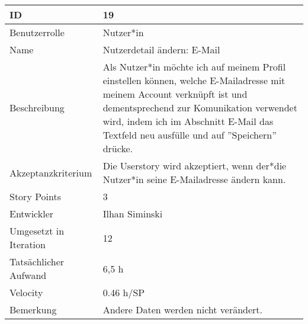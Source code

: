 \begin{tabularx}{\textwidth}{|p{}|X|}
	\hline
	ID & 19\\
	\hline
	Benutzerrolle & Nutzer*in\\
	\hline
	Name & Nutzerdetail ändern: E-Mail\\
	\hline
	Beschreibung & Als Nutzer*in möchte ich auf meinem Profil einstellen können, welche E-Mailadresse mit meinem Account verknüpft ist und dementsprechend zur Komunikation verwendet wird, indem ich im Abschnitt E-Mail das Textfeld neu ausfülle und auf ''Speichern'' drücke.\\
	\hline
	Akzeptanzkriterium & Die Userstory wird akzeptiert, wenn der*die Nutzer*in seine E-Mailadresse ändern kann.\\
	\hline
	Story Points & 3\\
	\hline
	Entwickler & Ilhan Siminski\\
	\hline
	Umgesetzt in Iteration & 12\\
	\hline
	Tatsächlicher Aufwand & 6,5 h\\
	\hline
	Velocity & 0.46 h/SP\\
	\hline
	Bemerkung & Andere Daten werden nicht verändert.\\
	\hline
\end{tabularx}
\vspace{20pt}

